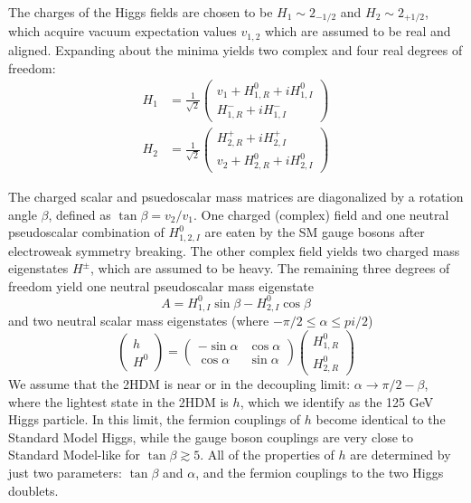 \documentclass{article}
\begin{document}
The charges of the Higgs fields are chosen to be $H_1 \sim 2_{-1/2}$ and $H_2 \sim 2_{+1/2}$, which acquire vacuum expectation values $v_{1,2}$ which are assumed to be real and aligned. Expanding about the minima yields two complex and four real degrees of freedom:
\begin{align}
    H_1 &= \frac{1}{\sqrt{2}} \begin{pmatrix} v_1 + H^{0}_{1, R} + iH^0_{1, I} \\  
                                              H^-_{1,R} + i H^-_{1, I}   \end{pmatrix} \\
    H_2 &= \frac{1}{\sqrt{2}} \begin{pmatrix} H^+_{2, R} + iH^+_{2, I} \\  
                                              v_2 + H^0_{2,R} + i H^0_{2, I}   \end{pmatrix} 
\end{align}

The charged scalar and psuedoscalar mass matrices are diagonalized by a rotation angle $\beta$, defined as $\tan\beta = v_2/v_1$. One charged (complex) field and one neutral pseudoscalar combination of $H^0_{1, 2, I}$ are eaten by the SM gauge bosons after electroweak symmetry breaking. The other complex field yields two charged mass eigenstates $H^\pm$, which are assumed to be heavy. The remaining three degrees of freedom yield one neutral pseudoscalar mass eigenstate 
\begin{equation}
    A = H^0_{1, I}\sin\beta - H^0_{2, I} \cos\beta
\end{equation}
and two neutral scalar mass eigenstates (where $-\pi/2 \leq \alpha \leq pi/2$)
\begin{equation}
    \begin{pmatrix} h \\ H^0 \end{pmatrix} = \begin{pmatrix} -\sin\alpha & \cos\alpha \\
                                                              \cos\alpha & \sin\alpha \end{pmatrix}
                                             \begin{pmatrix} H^0_{1, R} \\ H^0_{2, R}  \end{pmatrix}
\end{equation}
We assume that the 2HDM is near or in the decoupling limit: $\alpha \rightarrow \pi/2 - \beta$, where the lightest state in the 2HDM is $h$, which we identify as the 125 GeV Higgs particle. In this limit, the fermion couplings of $h$ become identical to the Standard Model Higgs, while the gauge boson couplings are very close to Standard Model-like for $\tan\beta \gtrsim 5$. All of the properties of $h$ are determined by just two parameters: $\tan\beta$ and $\alpha$, and the fermion couplings to the two Higgs doublets. 
\end{document}
